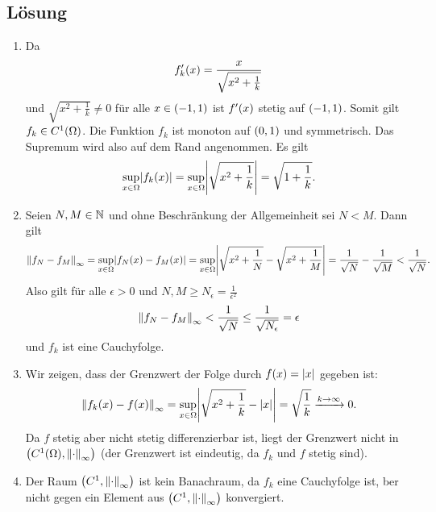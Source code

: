\documentclass{exercise}
\begin{document}
    \subsection*{Lösung}
    \begin{enumerate}
        \item Da
        \[
            f_k'\parentheses*{x} = \frac{x}{\sqrt{x^2 + \frac{1}{k}}}
        \]
        und \(\sqrt{x^2 + \frac{1}{k}} \ne 0\) für alle \(x \in \parentheses*{-1, 1}\) ist \(f'\parentheses*{x}\) stetig auf \(\parentheses*{-1, 1}\).
        Somit gilt \(f_k \in C^1\parentheses*{\Omega}\).
        Die Funktion \(f_k\) ist monoton auf \(\parentheses*{0, 1}\) und symmetrisch.
        Das Supremum wird also auf dem Rand angenommen.
        Es gilt
        \[
            \sup_{x \in \Omega}\absolute*{f_k\parentheses*{x}} = \sup_{x \in \Omega}\absolute*{\sqrt{x^2 + \frac{1}{k}}} = \sqrt{1 + \frac{1}{k}}.
        \]
        \item Seien \(N, M \in \N\) und ohne Beschränkung der Allgemeinheit sei \(N < M\).
        Dann gilt
        \[
            \norm*{f_N - f_M}_\infty = \sup_{x \in \Omega}\absolute*{f_N\parentheses*{x} - f_M\parentheses*{x}} = \sup_{x \in \Omega}\absolute*{\sqrt{x^2 + \frac{1}{N}} - \sqrt{x^2 + \frac{1}{M}}} = \frac{1}{\sqrt{N}} - \frac{1}{\sqrt{M}} < \frac{1}{\sqrt{N}}.
        \]
        Also gilt für alle \(\epsilon > 0\) und \(N, M \ge N_\epsilon = \frac{1}{\epsilon^2}\)
        \[
            \norm*{f_N - f_M}_\infty < \frac{1}{\sqrt{N}} \le \frac{1}{\sqrt{N_\epsilon}} = \epsilon
        \]
        und \(f_k\) ist eine Cauchyfolge.
        \item Wir zeigen, dass der Grenzwert der Folge durch \(f\parentheses*{x} = \absolute*{x}\) gegeben ist:
        \[
            \norm*{f_k\parentheses*{x} - f\parentheses*{x}}_\infty = \sup_{x \in \Omega}\absolute*{\sqrt{x^2 + \frac{1}{k}} - \absolute*{x}} = \sqrt{\frac{1}{k}} \xrightarrow{k \to \infty} 0.
        \]
        Da \(f\) stetig aber nicht stetig differenzierbar ist, liegt der Grenzwert nicht in \(\parentheses*{C^1\parentheses*{\Omega}, \norm*{\cdot}_\infty}\) (der Grenzwert ist eindeutig, da \(f_k\) und \(f\) stetig sind).
        \item Der Raum \(\parentheses*{C^1, \norm*{\cdot}_\infty}\) ist kein Banachraum, da \(f_k\) eine Cauchyfolge ist, ber nicht gegen ein Element aus \(\parentheses*{C^1, \norm*{\cdot}_\infty}\) konvergiert.
    \end{enumerate}
\end{document}
